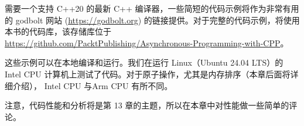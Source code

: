 需要一个支持 C++20 的最新 C++ 编译器，一些简短的代码示例将作为非常有用的 godbolt 网站 (\url{https://godbolt.org}) 的链接提供。对于完整的代码示例，将使用本书的代码库，该存储库位于 \url{https://github.com/PacktPublishing/Asynchronous-Programming-with-CPP}。

这些示例可以在本地编译和运行。我们在运行 Linux（Ubuntu 24.04 LTS）的 Intel CPU 计算机上测试了代码。对于原子操作，尤其是内存排序（本章后面将详细介绍）， Intel CPU 与Arm CPU 有所不同。

注意，代码性能和分析将是第 13 章的主题，所以在本章中对性能做一些简单的评论。

